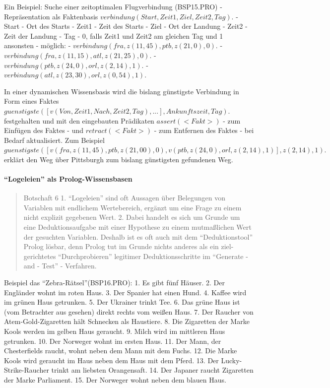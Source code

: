 \documentclass[a4paper]{article}
\begin{document}
\begin{multicols}{3}
  Ein Beispiel: Suche einer zeitoptimalen Flugverbindung (BSP15.PRO) -
  Repräsentation als Faktenbasis $verbindung(Start,Zeit1,Ziel,Zeit2,Tag).$
  - Start - Ort des Starts - Zeit1 - Zeit des Starts - Ziel - Ort der
  Landung - Zeit2 - Zeit der Landung - Tag - 0, falls Zeit1 und Zeit2 am
  gleichen Tag und 1 ansonsten - möglich: -
  $verbindung(fra,z(11,45),ptb,z(21,0),0).$ -
  $verbindung(fra,z(11,15),atl,z(21,25),0).$ -
  $verbindung(ptb,z(24,0),orl,z(2,14),1).$ -
  $verbindung(atl,z(23,30),orl,z(0,54),1).$

  In einer dynamischen Wissensbasis wird die bislang günstigste Verbindung
  in Form eines Faktes
  $guenstigste([ v(Von,Zeit1,Nach,Zeit2,Tag), ... ], Ankunftszeit, Tag ).$
  festgehalten und mit den eingebauten Prädikaten $assert(<Fakt>)$ - zum
  Einfügen des Faktes - und $retract (<Fakt>)$ - zum Entfernen des Faktes
  - bei Bedarf aktualisiert. Zum Beispiel
  $guenstigste([v(fra,z(11,45),ptb,z(21,00),0),v(ptb,z(24,0),orl,z(2,14),1)],z(2,14),1).$
  erklärt den Weg über Pittsburgh zum bislang günstigsten gefundenen Weg.

  \paragraph{``Logeleien'' als
    Prolog-Wissensbasen}\label{logeleien-als-prolog-wissensbasen}

  \begin{quote}
    Botschaft 6 1. ``Logeleien'' sind oft Aussagen über Belegungen von
    Variablen mit endlichem Wertebereich, ergänzt um eine Frage zu einem
    nicht explizit gegebenen Wert. 2. Dabei handelt es sich um Grunde um
    eine Deduktionsaufgabe mit einer Hypothese zu einem mutmaßlichen Wert
    der gesuchten Variablen. Deshalb ist es oft auch mit dem
    ``Deduktionstool'' Prolog lösbar, denn Prolog tut im Grunde nichts
    anderes als ein ziel-gerichtetes ``Durchprobieren'' legitimer
    Deduktionsschritte im ``Generate - and - Test'' - Verfahren.
  \end{quote}

  Beispiel das ``Zebra-Rätsel''(BSP16.PRO): 1. Es gibt fünf Häuser. 2. Der
  Engländer wohnt im roten Haus. 3. Der Spanier hat einen Hund. 4. Kaffee
  wird im grünen Haus getrunken. 5. Der Ukrainer trinkt Tee. 6. Das grüne
  Haus ist (vom Betrachter aus gesehen) direkt rechts vom weißen Haus. 7.
  Der Raucher von Atem-Gold-Zigaretten hält Schnecken als Haustiere. 8.
  Die Zigaretten der Marke Kools werden im gelben Haus geraucht. 9. Milch
  wird im mittleren Haus getrunken. 10. Der Norweger wohnt im ersten Haus.
  11. Der Mann, der Chesterfields raucht, wohnt neben dem Mann mit dem
  Fuchs. 12. Die Marke Kools wird geraucht im Haus neben dem Haus mit dem
  Pferd. 13. Der Lucky-Strike-Raucher trinkt am liebsten Orangensaft. 14.
  Der Japaner raucht Zigaretten der Marke Parliament. 15. Der Norweger
  wohnt neben dem blauen Haus.


\end{multicols}
\end{document}
